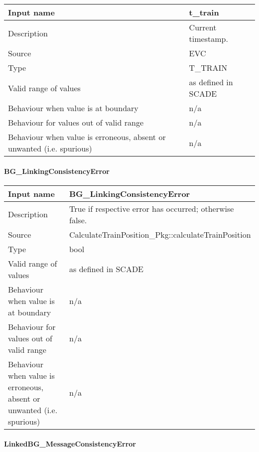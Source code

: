 \begin{longtable}{p{}p{}}
\toprule
Input name				& t\_train \\
\midrule
Description				& Current timestamp. \\
\midrule
Source					& EVC \\ 
\midrule
Type					& T\_TRAIN \\
\midrule
Valid range of values	& as defined in SCADE \\
\midrule
Behaviour when value is at boundary	& n/a \\
\midrule
Behaviour for values out of valid range	& n/a \\
\midrule
Behaviour when value is erroneous, absent or unwanted (i.e. spurious) & n/a \\
\bottomrule
\end{longtable}

\paragraph{BG\_LinkingConsistencyError}

\begin{longtable}{p{}p{}}
\toprule
Input name				& BG\_LinkingConsistencyError \\
\midrule
Description				& True if respective error has occurred; otherwise false. \\
\midrule
Source					& CalculateTrainPosition\_Pkg::calculateTrainPosition \\ 
\midrule
Type					& bool \\
\midrule
Valid range of values	& as defined in SCADE \\
\midrule
Behaviour when value is at boundary	& n/a \\
\midrule
Behaviour for values out of valid range	& n/a \\
\midrule
Behaviour when value is erroneous, absent or unwanted (i.e. spurious) & n/a \\
\bottomrule
\end{longtable}

\paragraph{LinkedBG\_MessageConsistencyError}

